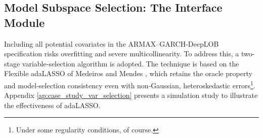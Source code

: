 \documentclass[10pt,a4paper,oneside]{article}
\begin{document}






\subsection{Model Subspace Selection: The Interface Module}
\label{subsec:covariates_selection}

Including all potential covariates in the ARMAX–GARCH-DeepLOB specification risks overfitting and severe multicollinearity. To address this, a two-stage variable‐selection algorithm is adopted. The technique is based on the Flexible adaLASSO of Medeiros and Mendes \cite{MEDEIROS2016255}, which retains the oracle property and model‐selection consistency even with non‐Gaussian, heteroskedastic errors\footnote{Under some regularity conditions, of course.}. Appendix \ref{ap:case_study_var_selection} presents a simulation study to illustrate the effectiveness of adaLASSO.

\end{document}
